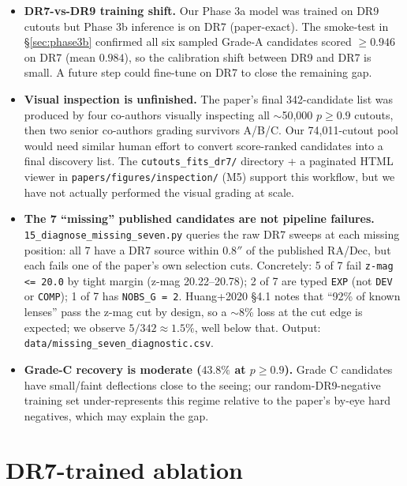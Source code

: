 \documentclass[11pt,letterpaper]{article}
\begin{document}
\begin{itemize}
\item \textbf{DR7-vs-DR9 training shift.} Our Phase 3a model was trained
      on DR9 cutouts but Phase 3b inference is on DR7 (paper-exact).
      The smoke-test in \S\ref{sec:phase3b} confirmed all six sampled
      Grade-A candidates scored $\geq 0.946$ on DR7 (mean $0.984$), so
      the calibration shift between DR9 and DR7 is small. A future
      step could fine-tune on DR7 to close the remaining gap.
\item \textbf{Visual inspection is unfinished.} The paper's final
      342-candidate list was produced by four co-authors visually
      inspecting all $\sim$50{,}000 $p \geq 0.9$ cutouts, then two
      senior co-authors grading survivors A/B/C. Our 74{,}011-cutout
      pool would need similar human effort to convert score-ranked
      candidates into a final discovery list. The \texttt{cutouts\_fits\_dr7/}
      directory + a paginated HTML viewer in
      \texttt{papers/figures/inspection/} (M5) support this workflow,
      but we have not actually performed the visual grading at scale.
\item \textbf{The 7 ``missing'' published candidates are not pipeline
      failures.} \texttt{15\_diagnose\_missing\_seven.py} queries the
      raw DR7 sweeps at each missing position: all 7 have a DR7 source
      within $0.8''$ of the published RA/Dec, but each fails one of
      the paper's own selection cuts. Concretely:
      5 of 7 fail \verb|z-mag <= 20.0| by tight margin (z-mag
      20.22--20.78); 2 of 7 are typed \verb|EXP| (not \verb|DEV| or
      \verb|COMP|); 1 of 7 has \verb|NOBS_G = 2|. Huang+2020 \S4.1
      notes that ``92\% of known lenses'' pass the z-mag cut by design,
      so a $\sim$8\% loss at the cut edge is expected; we observe
      $5/342 \approx 1.5\%$, well below that. Output:
      \texttt{data/missing\_seven\_diagnostic.csv}.
\item \textbf{Grade-C recovery is moderate ($43.8\%$ at $p \geq 0.9$).}
      Grade C candidates have small/faint deflections close to the
      seeing; our random-DR9-negative training set under-represents
      this regime relative to the paper's by-eye hard negatives, which
      may explain the gap.
\end{itemize}

\section{DR7-trained ablation}
\label{sec:dr7-ablation}
\end{document}
